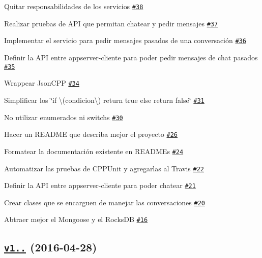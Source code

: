 \begin{DoxyItemize}
\item Quitar responsabilidades de los servicios \href{https://github.com/seguijoaquin/taller2-appserver/issues/38}{\tt \#38}
\item Realizar pruebas de A\+PI que permitan chatear y pedir mensajes \href{https://github.com/seguijoaquin/taller2-appserver/issues/37}{\tt \#37}
\item Implementar el servicio para pedir mensajes pasados de una conversación \href{https://github.com/seguijoaquin/taller2-appserver/issues/36}{\tt \#36}
\item Definir la A\+PI entre appserver-\/cliente para poder pedir mensajes de chat pasados \href{https://github.com/seguijoaquin/taller2-appserver/issues/35}{\tt \#35}
\item Wrappear Json\+C\+PP \href{https://github.com/seguijoaquin/taller2-appserver/issues/34}{\tt \#34}
\item Simplificar los \char`\"{}if \textbackslash{}(condicion\textbackslash{}) return true else return false\char`\"{} \href{https://github.com/seguijoaquin/taller2-appserver/issues/31}{\tt \#31}
\item No utilizar enumerados ni switchs \href{https://github.com/seguijoaquin/taller2-appserver/issues/30}{\tt \#30}
\item Hacer un R\+E\+A\+D\+ME que describa mejor el proyecto \href{https://github.com/seguijoaquin/taller2-appserver/issues/26}{\tt \#26}
\item Formatear la documentación existente en R\+E\+A\+D\+M\+Es \href{https://github.com/seguijoaquin/taller2-appserver/issues/24}{\tt \#24}
\item Automatizar las pruebas de C\+P\+P\+Unit y agregarlas al Travis \href{https://github.com/seguijoaquin/taller2-appserver/issues/22}{\tt \#22}
\item Definir la A\+PI entre appserver-\/cliente para poder chatear \href{https://github.com/seguijoaquin/taller2-appserver/issues/21}{\tt \#21}
\item Crear clases que se encarguen de manejar las conversaciones \href{https://github.com/seguijoaquin/taller2-appserver/issues/20}{\tt \#20}
\item Abtraer mejor el Mongoose y el Rocks\+DB \href{https://github.com/seguijoaquin/taller2-appserver/issues/16}{\tt \#16}
\end{DoxyItemize}

\subsection*{\href{https://github.com/seguijoaquin/taller2-appserver/tree/v1.0.0}{\tt v1..} (2016-\/04-\/28)}

